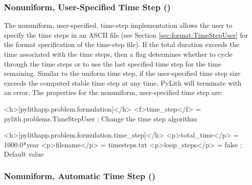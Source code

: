 \subsubsection{Nonuniform, User-Specified Time Step ()}

The nonuniform, user-specified, time-step implementation allows the
user to specify the time steps in an ASCII file (see Section
\vref{sec:format:TimeStepUser} for the format specification of the
time-step file). If the total duration exceeds the time associated
with the time steps, then a flag determines whether to cycle through
the time steps or to use the last specified time step for the time
remaining. Similar to the uniform time step, if the user-specified
time step size exceeds the computed stable time step at any time,
PyLith will terminate with an error.  The properties for the
nonuniform, user-specified time step are:
\begin{inventory}
\end{inventory}

\begin{cfg}
<h>[pylithapp.problem.formulation]</h>
<f>time_step</f> = pylith.problems.TimeStepUser ; Change the time step algorithm

<h>[pylithapp.problem.formulation.time_step]</h>
<p>total_time</p> = 1000.0*year
<p>filename</p> = timesteps.txt
<p>loop_steps</p> = false ; Default value
\end{cfg}

\subsubsection{Nonuniform, Automatic Time Step ()}

